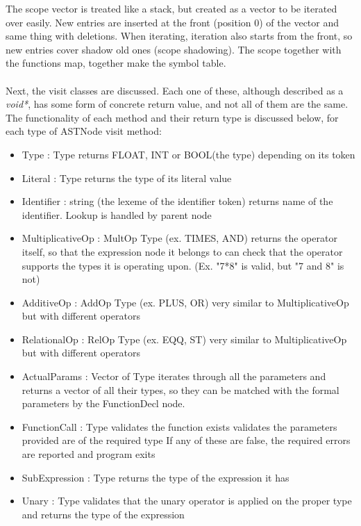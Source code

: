 The scope vector is treated like a stack, but created as a vector to be iterated over easily. New entries are inserted at the front (position 0) of the vector and same thing with deletions. When iterating, iteration also starts from the front, so new entries cover shadow old ones (scope shadowing). The scope together with the functions map, together make the symbol table.
\\\\
Next, the visit classes are discussed. Each one of these, although described as a \textit{void*}, has some form of concrete return value, and not all of them are the same. The functionality of each method and their return type is discussed below, for each type of ASTNode visit method:
\begin{itemize}
	\item Type : Type 
		\subitem returns FLOAT, INT or BOOL(the type) depending on its token
	\item Literal : Type
		\subitem returns the type of its literal value
	\item Identifier : string (the lexeme of the identifier token)
		\subitem returns name of the identifier. Lookup is handled by parent node
	\item MultiplicativeOp : MultOp Type (ex. TIMES, AND)
		\subitem returns the operator itself, so that the expression node it belongs to can check that the operator supports the types it is operating upon. (Ex. "7*8" is valid, but "7 and 8" is not)
	\item AdditiveOp : AddOp Type (ex. PLUS, OR)
		\subitem very similar to MultiplicativeOp but with different operators
	\item RelationalOp : RelOp Type (ex. EQQ, ST)
		\subitem very similar to MultiplicativeOp but with different operators
	\item ActualParams : Vector of Type
		\subitem iterates through all the parameters and returns a vector of all their types, so they can be matched with the formal parameters by the FunctionDecl node.
	\item FunctionCall : Type
		\subitem validates the function exists
		\subitem validates the parameters provided are of the required type
		\subitem If any of these are false, the required errors are reported and program exits
	\item SubExpression : Type
		\subitem returns the type of the expression it has
	\item Unary : Type
		\subitem validates that the unary operator is applied on the proper type and returns the type of the expression

\end{itemize}
